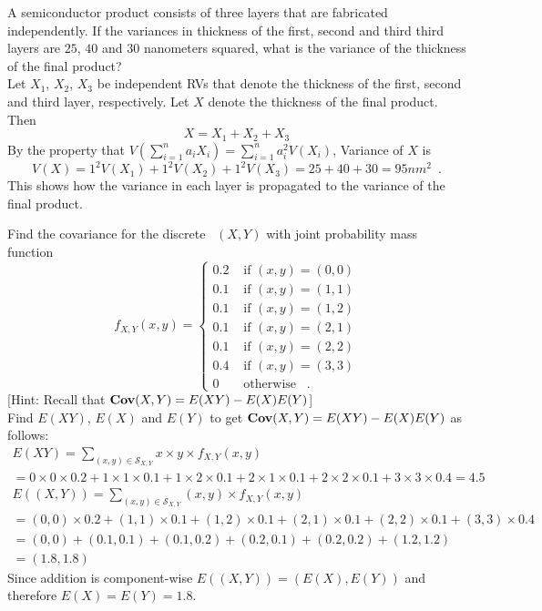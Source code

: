 \begin{ExerciseList}
\Exercise
A semiconductor product consists of three layers that are fabricated independently.  
If the variances in thickness of the first, second and third third layers are $25$, $40$ and $30$ nanometers squared, what is the variance of the thickness of the final product? 
\Answer
~\\
Let $X_1$, $X_2$, $X_3$ be independent RVs that denote the thickness of the first, second and third layer, respectively.  Let $X$ denote the thickness of the final product.  Then
\[
X= X_1+X_2+X_3
\]
By the property that $V\left(\sum_{i=1}^n a_i X_i\right) = \sum_{i=1}^n a_i^2 V(X_i)$, Variance of $X$ is
\[
V(X) = 1^2 V(X_1) + 1^2 V(X_2) + 1^2 V(X_3) = 25+40+30 = 95 nm^2 \enspace .
\] 
This shows how the variance in each layer is propagated to the variance of the final product.

\Exercise
Find the covariance for the discrete \rv~$(X,Y)$ with joint probability mass function
\[
f_{X,Y}(x,y) = 
\begin{cases}
0.2 & \text{ if } (x,y)=(0,0)\\
0.1 & \text{ if } (x,y)=(1,1)\\
0.1 & \text{ if } (x,y)=(1,2)\\
0.1 & \text{ if } (x,y)=(2,1)\\
0.1 & \text{ if } (x,y)=(2,2)\\
0.4 & \text{ if } (x,y)=(3,3)\\
0 & \text{ otherwise } \enspace .
\end{cases}
\]
[Hint: Recall that $\mathbf{Cov}(X,Y)=E(XY)-E(X)E(Y)$]
\Answer
~\\
Find $E(XY)$, $E(X)$ and $E(Y)$ to get $\mathbf{Cov}(X,Y)=E(XY)-E(X)E(Y)$ as follows:
\begin{multline*}
E(XY) = \sum_{(x,y) \in \mathcal{S}_{X,Y}} x \times y \times f_{X,Y}(x,y) \\
= 0 \times 0 \times 0.2 + 1 \times 1 \times 0.1+ 1 \times 2 \times 0.1 + 2 \times 1 \times 0.1 + 2 \times 2 \times 0.1 + 3 \times 3 \times 0.4 = 4.5
\end{multline*}
\begin{multline*}
E((X,Y)) = \sum_{(x,y) \in \mathcal{S}_{X,Y}} (x , y) \times f_{X,Y}(x,y) \\
= (0 , 0) \times 0.2 + (1 , 1) \times 0.1 + (1 , 2) \times 0.1 + (2 , 1) \times 0.1 + (2 , 2) \times 0.1 + (3 , 3) \times 0.4\\= (0,0)+(0.1,0.1)+(0.1,0.2)+(0.2,0.1)+(0.2,0.2)+(1.2,1.2) \\
= (1.8,1.8) 
\end{multline*}
Since addition is component-wise $E((X,Y))=(E(X),E(Y))$ and therefore $E(X)=E(Y)=1.8$.


\end{ExerciseList}
